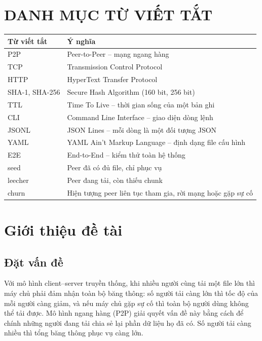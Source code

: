 \documentclass[12pt,a4paper,oneside]{report}
\begin{document}
\chapter*{DANH MỤC TỪ VIẾT TẮT}
\begin{center}
\begin{tabularx}{\textwidth}{@{}lL@{}}
\toprule
\textbf{Từ viết tắt} & \textbf{Ý nghĩa}\\\midrule
P2P & Peer-to-Peer -- mạng ngang hàng\\
TCP & Transmission Control Protocol\\
HTTP & HyperText Transfer Protocol\\
SHA-1, SHA-256 & Secure Hash Algorithm (160 bit, 256 bit)\\
TTL & Time To Live -- thời gian sống của một bản ghi\\
CLI & Command Line Interface -- giao diện dòng lệnh\\
JSONL & JSON Lines -- mỗi dòng là một đối tượng JSON\\
YAML & YAML Ain't Markup Language -- định dạng file cấu hình\\
E2E & End-to-End -- kiểm thử toàn hệ thống\\
seed & Peer đã có đủ file, chỉ phục vụ\\
leecher & Peer đang tải, còn thiếu chunk\\
churn & Hiện tượng peer liên tục tham gia, rời mạng hoặc gặp sự cố\\
\bottomrule
\end{tabularx}
\end{center}

\cleardoublepage
{}

\chapter{Giới thiệu đề tài}

\section{Đặt vấn đề}

Với mô hình client--server truyền thống, khi nhiều người cùng tải một file lớn thì máy chủ phải đảm nhận toàn bộ băng thông: số người tải càng lớn thì tốc độ của mỗi người càng giảm, và nếu máy chủ gặp sự cố thì toàn bộ người dùng không thể tải được. Mô hình ngang hàng (P2P) giải quyết vấn đề này bằng cách để chính những người đang tải chia sẻ lại phần dữ liệu họ đã có. Số người tải càng nhiều thì tổng băng thông phục vụ càng lớn.
\end{document}
